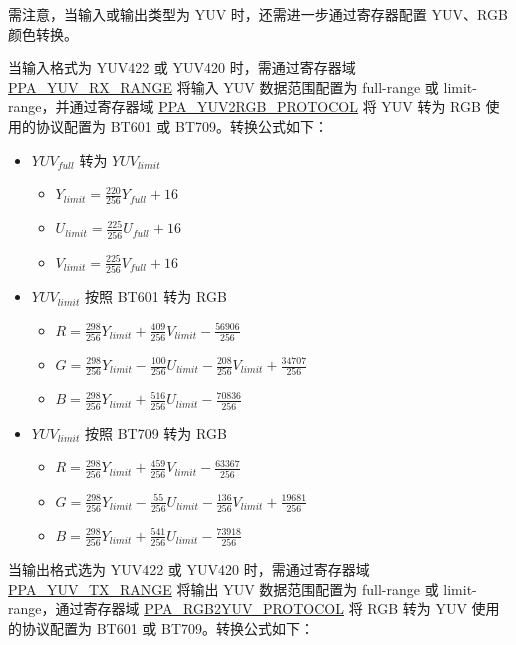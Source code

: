 \documentclass[main\_\_CN.tex]{subfiles}
\begin{document}
需注意，当输入或输出类型为 YUV 时，还需进一步通过寄存器配置 YUV、RGB 颜色转换。

当输入格式为 YUV422 或 YUV420 时，需通过寄存器域 \hyperref[fielddesc:PPAYUVRXRANGE]{PPA\_YUV\_RX\_RANGE} 将输入 YUV 数据范围配置为 full-range 或 limit-range，并通过寄存器域 \hyperref[fielddesc:PPAYUV2RGBPROTOCOL]{PPA\_YUV2RGB\_PROTOCOL} 将 YUV 转为 RGB 使用的协议配置为 BT601 或 BT709。转换公式如下：


\begin{itemize}
    \item $YUV_{full}$ 转为 $YUV_{limit}$
        \begin{itemize}
            \item $Y_{limit} = \frac{220}{256} Y_{full} + 16$
            \item $U_{limit} = \frac{225}{256} U_{full} + 16$
            \item $V_{limit} = \frac{225}{256} V_{full} + 16$
        \end{itemize}
    \item $YUV_{limit}$ 按照 BT601 转为 RGB
        \begin{itemize}
            \item $R = \frac{298}{256}Y_{limit} + \frac{409}{256}V_{limit} - \frac{56906}{256}$
            \item $G = \frac{298}{256}Y_{limit} - \frac{100}{256}U_{limit} - \frac{208}{256}V_{limit} + \frac{34707}{256}$
            \item $B = \frac{298}{256}Y_{limit} + \frac{516}{256}U_{limit} -  \frac{70836}{256}$
        \end{itemize}
    \item $YUV_{limit}$ 按照 BT709 转为 RGB
        \begin{itemize}
            \item $R = \frac{298}{256}Y_{limit} + \frac{459}{256}V_{limit} - \frac{63367}{256}$
            \item $G = \frac{298}{256}Y_{limit} - \frac{55}{256}U_{limit} - \frac{136}{256}V_{limit} + \frac{19681}{256}$
            \item $B = \frac{298}{256}Y_{limit} + \frac{541}{256}U_{limit} -  \frac{73918}{256}$
        \end{itemize}
\end{itemize}

当输出格式选为 YUV422 或 YUV420 时，需通过寄存器域 \hyperref[fielddesc:PPAYUVTXRANGE]{PPA\_YUV\_TX\_RANGE} 将输出 YUV 数据范围配置为 full-range 或 limit-range，通过寄存器域 \hyperref[fielddesc:PPARGB2YUVPROTOCOL]{PPA\_RGB2YUV\_PROTOCOL} 将 RGB 转为 YUV 使用的协议配置为 BT601 或 BT709。转换公式如下：
\end{document}
